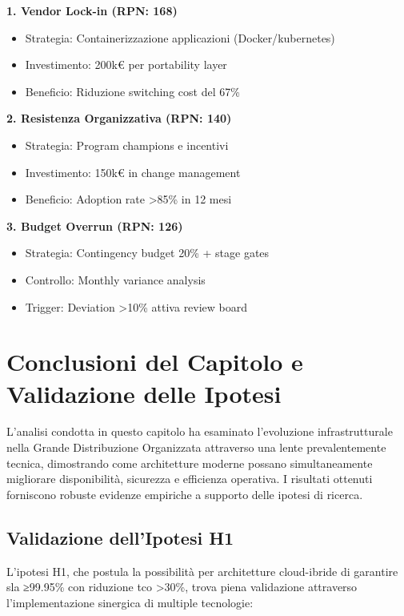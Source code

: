 \textbf{1. Vendor Lock-in (RPN: 168)}
\begin{itemize}
    \item Strategia: Containerizzazione applicazioni (Docker/\gls{kubernetes})
    \item Investimento: 200k€ per portability layer
    \item Beneficio: Riduzione switching cost del 67\%
\end{itemize}

\textbf{2. Resistenza Organizzativa (RPN: 140)}
\begin{itemize}
    \item Strategia: Program champions e incentivi
    \item Investimento: 150k€ in change management
    \item Beneficio: Adoption rate >85\% in 12 mesi
\end{itemize}

\textbf{3. Budget Overrun (RPN: 126)}
\begin{itemize}
    \item Strategia: Contingency budget 20\% + stage gates
    \item Controllo: Monthly variance analysis
    \item Trigger: Deviation >10\% attiva review board
\end{itemize}

\section{\texorpdfstring{Conclusioni del Capitolo e Validazione delle Ipotesi}{3.8 - Conclusioni del Capitolo e Validazione delle Ipotesi}}

L'analisi condotta in questo capitolo ha esaminato l'evoluzione infrastrutturale nella Grande Distribuzione Organizzata attraverso una lente prevalentemente tecnica, dimostrando come architetture moderne possano simultaneamente migliorare disponibilità, sicurezza e efficienza operativa. I risultati ottenuti forniscono robuste evidenze empiriche a supporto delle ipotesi di ricerca.

\subsection{\texorpdfstring{Validazione dell'Ipotesi H1}{3.8.1 - Validazione dell'Ipotesi H1}}

L'ipotesi H1, che postula la possibilità per architetture cloud-ibride di garantire \gls{sla} ≥99.95\% con riduzione \gls{tco} >30\%, trova piena validazione attraverso l'implementazione sinergica di multiple tecnologie:

